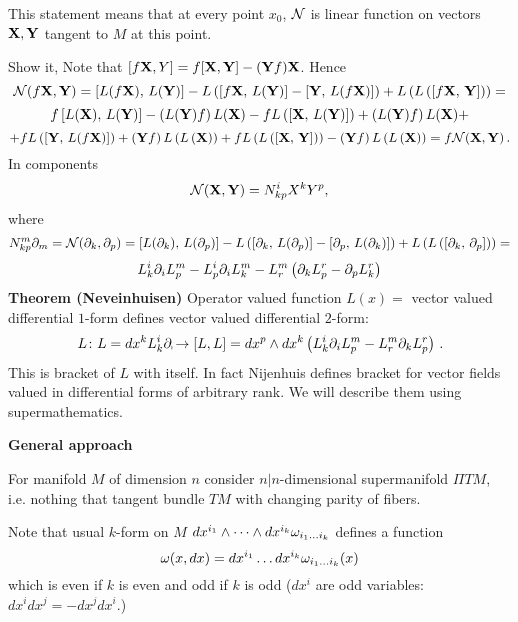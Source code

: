 \m

This statement means that at every point $x_0$,
 ${\cal N}$ is linear function
on vectors ${\bf X},{\bf Y}$ tangent to $M$ at this point. 


 Show it,  Note that 
  $[f{\bf X},Y]=f[{\bf X},{\bf Y}]-({\bf Y} f){\bf X}$. Hence
         $$
  {\cal N}(f{\bf X},{\bf Y})=
 \left[L(f{\bf X}),\,L({\bf Y})\right]-
                    L\left(
              \left[f{\bf X},\,L({\bf Y})\right]-\left[{\bf Y},\,L(f{\bf X})\right]
                    \right)+
                      L\left(
                    L\left(
              \left[f{\bf X},\,{\bf Y}\right]
                    \right)
                     \right)=
               $$ 
               $$
          f\left[L({\bf X}),\,L({\bf Y})\right]-\left(L({\bf Y})f\right)L({\bf X})
      -fL\left(\left[{\bf X},\,L({\bf Y})\right]\right)+\left(L({\bf Y})f\right)L({\bf X})+
            $$
            $$
          +fL\left(
             \left[{\bf Y},\,L(f{\bf X})\right]
                    \right)+
                \left({\bf Y} f\right)L\left(L\left({\bf X}\right)\right)
                +f L\left(
                    L\left(
              \left[{\bf X},\,{\bf Y}\right]
                    \right)
                     \right)-
     \left({\bf Y} f\right)L\left(L\left({\bf X}\right)\right)
             =f{\cal N}({\bf X},{\bf Y})\,.
                    $$
In components
        $$
{\cal N}({\bf X},{\bf Y})=N^i_{kp}X^kY^p, 
        $$
where $$
N^m_{kp}\partial_m={\cal N}(\partial_k,\partial_p)=\left[L(\partial_k),\,L(\partial_p)\right]-
                    L\left(
              \left[\partial_k,\,L(\partial_p)\right]-\left[\partial_p,\,L(\partial_k)\right]
                    \right)+
                      L\left(
                    L\left(
              \left[\partial_k,\,\partial_p\right]
                    \right)
                     \right)=
           $$
            $$
     L^i_k\partial_i L^m_p-L^i_p\partial_i L^m_k-
      L^m_r\left(\partial_kL_p^r-\partial_p L_k^r\right)
           $$
{\bf Theorem (Neveinhuisen)} Operator valued function $L(x)=$
  vector valued differential $1$-form  defines
  vector valued differential $2$-form:
  $$
  L\colon L=dx^kL_k^i\partial_\mapsto [L,L]=dx^p\wedge dx^k
      \left(L^i_k\partial_i L^m_p-
      L^m_r\partial_kL_p^r
\right)\,. 
            $$ 
  This is  bracket of $L$ with itself.
In fact Nijenhuis defines bracket for vector fields valued 
in differential forms of arbitrary rank.
  We will describe them using supermathematics.

     \centerline  {\bf General approach}

  For  manifold $M$ of dimension $n$ consider $n|n$-dimensional
supermanifold $\Pi TM$, i.e. nothing that tangent bundle $TM$ with
changing parity of fibers.

    Note that usual $k$-form on $M$ 
$dx^{i_1}\wedge\dots\wedge dx^{i_k}\omega_{i_1\dots i_k}$ defines a function
            $$
    \omega(x,dx)=dx^{i_1}\dots dx^{i_k}\omega_{i_1\dots i_k}(x)
            $$
 which is even if $k$ is even and odd if $k$ is odd
($dx^i$ are odd variables: $dx^idx^j=-dx^jdx^i$.)

